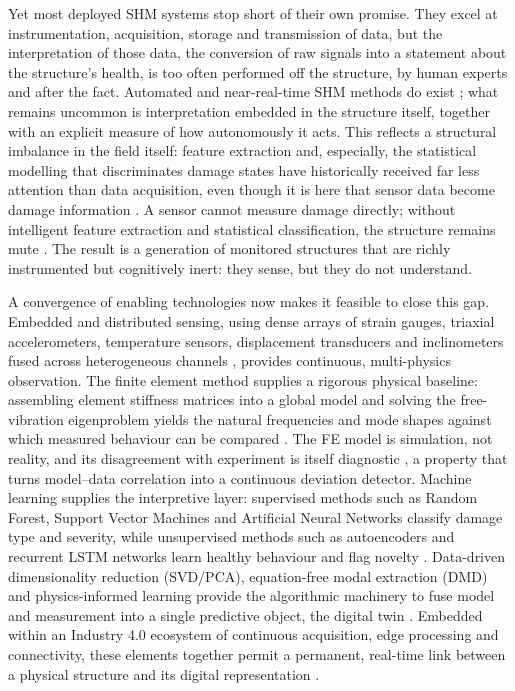 Yet most deployed SHM systems stop short of their own promise. They excel at instrumentation, acquisition, storage and transmission of data, but the interpretation of those data, the conversion of raw signals into a statement about the structure's health, is too often performed off the structure, by human experts and after the fact. Automated and near-real-time SHM methods do exist \citep{avci2021review,he2022integrated}; what remains uncommon is interpretation embedded in the structure itself, together with an explicit measure of how autonomously it acts. This reflects a structural imbalance in the field itself: feature extraction and, especially, the statistical modelling that discriminates damage states have historically received far less attention than data acquisition, even though it is here that sensor data become damage information \citep{farrar2013shm}. A sensor cannot measure damage directly; without intelligent feature extraction and statistical classification, the structure remains mute \citep{farrar2013shm}. The result is a generation of monitored structures that are richly instrumented but cognitively inert: they sense, but they do not understand.

A convergence of enabling technologies now makes it feasible to close this gap. Embedded and distributed sensing, using dense arrays of strain gauges, triaxial accelerometers, temperature sensors, displacement transducers and inclinometers fused across heterogeneous channels \citep{farrar2013shm}, provides continuous, multi-physics observation. The finite element method supplies a rigorous physical baseline: assembling element stiffness matrices into a global model and solving the free-vibration eigenproblem yields the natural frequencies and mode shapes against which measured behaviour can be compared \citep{cook2002fea}. The FE model is simulation, not reality, and its disagreement with experiment is itself diagnostic \citep{cook2002fea}, a property that turns model--data correlation into a continuous deviation detector. Machine learning supplies the interpretive layer: supervised methods such as Random Forest, Support Vector Machines and Artificial Neural Networks classify damage type and severity, while unsupervised methods such as autoencoders and recurrent LSTM networks learn healthy behaviour and flag novelty \citep{naser2023ml,brunton2019data,wangcha2022unsupervised}. Data-driven dimensionality reduction (SVD/PCA), equation-free modal extraction (DMD) and physics-informed learning provide the algorithmic machinery to fuse model and measurement into a single predictive object, the digital twin \citep{brunton2019data,chiachio2022structural}. Embedded within an Industry 4.0 ecosystem of continuous acquisition, edge processing and connectivity, these elements together permit a permanent, real-time link between a physical structure and its digital representation \citep{li2025edge,zou2026deep}.

